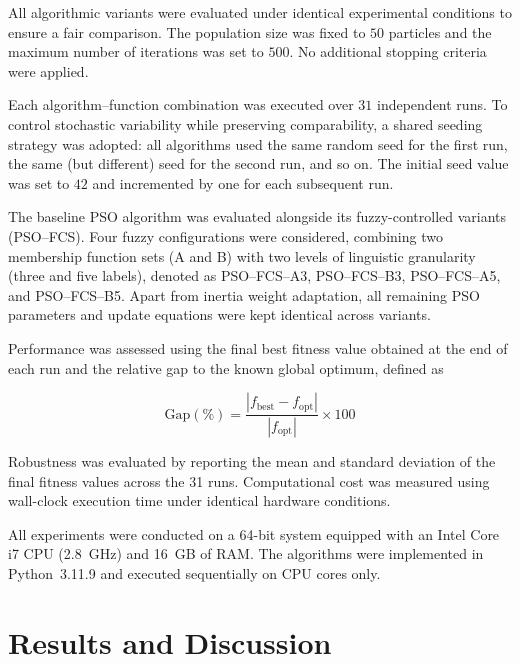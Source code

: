 \documentclass[runningheads]{llncs}
\begin{document}
All algorithmic variants were evaluated under identical experimental conditions to ensure a fair comparison. The population size was fixed to $50$ particles and the maximum number of iterations was set to $500$. No additional stopping criteria were applied.

Each algorithm--function combination was executed over $31$ independent runs. To control stochastic variability while preserving comparability, a shared seeding strategy was adopted: all algorithms used the same random seed for the first run, the same (but different) seed for the second run, and so on. The initial seed value was set to $42$ and incremented by one for each subsequent run.

The baseline PSO algorithm was evaluated alongside its fuzzy-controlled variants (PSO--FCS). Four fuzzy configurations were considered, combining two membership function sets (A and B) with two levels of linguistic granularity (three and five labels), denoted as PSO--FCS--A3, PSO--FCS--B3, PSO--FCS--A5, and PSO--FCS--B5. Apart from inertia weight adaptation, all remaining PSO parameters and update equations were kept identical across variants.

Performance was assessed using the final best fitness value obtained at the end of each run and the relative gap to the known global optimum, defined as

\begin{equation}
    \text{Gap}(\%) =
    \frac{\left| f_{\text{best}} - f_{\text{opt}} \right|}
    {\left| f_{\text{opt}} \right|} \times 100
    \label{eq:gap_metric}
\end{equation}

Robustness was evaluated by reporting the mean and standard deviation of the final fitness values across the 31 runs. Computational cost was measured using wall-clock execution time under identical hardware conditions.

All experiments were conducted on a 64-bit system equipped with an Intel Core i7 CPU (2.8~GHz) and 16~GB of RAM. The algorithms were implemented in Python~3.11.9 and executed sequentially on CPU cores only.





\section{Results and Discussion}
\label{sec:results}
\end{document}
